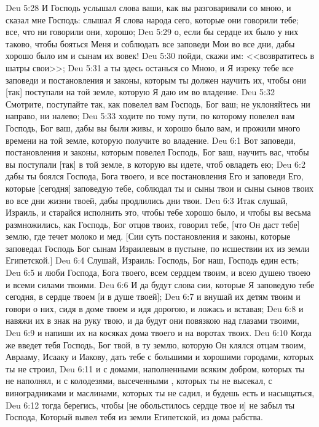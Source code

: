 \vs Deu 5:28 И Господь услышал слова ваши, как вы разговаривали со мною, и сказал мне Господь: слышал Я слова народа сего, которые они говорили тебе; все, что ни говорили они, хорошо;
\vs Deu 5:29 о, если бы сердце их было у них таково, чтобы бояться Меня и соблюдать все заповеди Мои во все дни, дабы хорошо было им и сынам их вовек!
\vs Deu 5:30 пойди, скажи им: <<возвратитесь в шатры свои>>;
\vs Deu 5:31 а ты здесь останься со Мною, и Я изреку тебе все заповеди и постановления и законы, которым ты должен научить их, чтобы они [так] поступали на той земле, которую Я даю им во владение.
\vs Deu 5:32 Смотрите, поступайте так, как повелел вам Господь, Бог ваш; не уклоняйтесь ни направо, ни налево;
\vs Deu 5:33 ходите по тому пути, по которому повелел вам Господь, Бог ваш, дабы вы были живы, и хорошо было вам, и прожили много времени на той земле, которую получите во владение.
\vs Deu 6:1 Вот заповеди, постановления и законы, которым повелел Господь, Бог ваш, научить вас, чтобы вы поступали [так] в той земле, в которую вы идете, чтоб овладеть ею;
\vs Deu 6:2 дабы ты боялся Господа, Бога твоего, и все постановления Его и заповеди Его, которые [сегодня] заповедую тебе, соблюдал ты и сыны твои и сыны сынов твоих во все дни жизни твоей, дабы продлились дни твои.
\vs Deu 6:3 Итак слушай, Израиль, и старайся исполнить это, чтобы тебе хорошо было, и чтобы вы весьма размножились, как Господь, Бог отцов твоих, говорил тебе, [что Он даст тебе] землю, где течет молоко и мед. [Сии суть постановления и законы, которые заповедал Господь Бог сынам Израилевым в пустыне, по исшествии их из земли Египетской.]
\rsbpar\vs Deu 6:4 Слушай, Израиль: Господь, Бог наш, Господь един есть;
\vs Deu 6:5 и люби Господа, Бога твоего, всем сердцем твоим, и всею душею твоею и всеми силами твоими.
\vs Deu 6:6 И да будут слова сии, которые Я заповедую тебе сегодня, в сердце твоем [и в душе твоей];
\vs Deu 6:7 и внушай их детям твоим и говори о них, сидя в доме твоем и идя дорогою, и ложась и вставая;
\vs Deu 6:8 и навяжи их в знак на руку твою, и да будут они повязкою над глазами твоими,
\vs Deu 6:9 и напиши их на косяках дома твоего и на воротах твоих.
\vs Deu 6:10 Когда же введет тебя Господь, Бог твой, в ту землю, которую Он клялся отцам твоим, Аврааму, Исааку и Иакову, дать тебе с большими и хорошими городами, которых ты не строил,
\vs Deu 6:11 и с домами, наполненными всяким добром, которых ты не наполнял, и с колодезями, высеченными , которых ты не высекал, с виноградниками и маслинами, которых ты не садил, и будешь есть и насыщаться,
\vs Deu 6:12 тогда берегись, чтобы [не обольстилось сердце твое и] не забыл ты Господа, Который вывел тебя из земли Египетской, из дома рабства.
